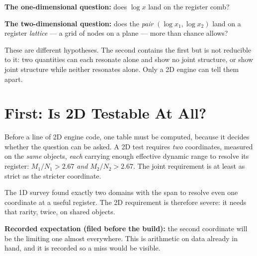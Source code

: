 \documentclass[11pt, letterpaper, openany]{book}
\begin{document}
\begin{signalbox}
\textbf{The one-dimensional question:} does $\log x$ land on the register comb?

\textbf{The two-dimensional question:} does the \emph{pair} $(\log x_1, \log x_2)$ land on a
register \emph{lattice} --- a grid of nodes on a plane --- more than chance allows?

\medskip
These are different hypotheses. The second contains the first but is not reducible to it: two
quantities can each resonate alone and show no joint structure, or show joint structure while
neither resonates alone. Only a 2D engine can tell them apart.
\end{signalbox}

\section{First: Is 2D Testable At All?}

Before a line of 2D engine code, one table must be computed, because it decides whether the
question can be asked. A 2D test requires \emph{two} coordinates, measured on the \emph{same}
objects, \emph{each} carrying enough effective dynamic range to resolve its register:
$M_1/N_1 > 2.67$ \emph{and} $M_2/N_2 > 2.67$. The joint requirement is at least as strict as the
stricter coordinate.

The 1D survey found exactly two domains with the span to resolve even one coordinate at a useful
register. The 2D requirement is therefore severe: it needs that rarity, twice, on shared objects.

\begin{predictionbox}
\textbf{Recorded expectation (filed before the build):} the second coordinate will be the
limiting one almost everywhere. This is arithmetic on data already in hand, and it is recorded so
a miss would be visible.
\end{predictionbox}
\end{document}
